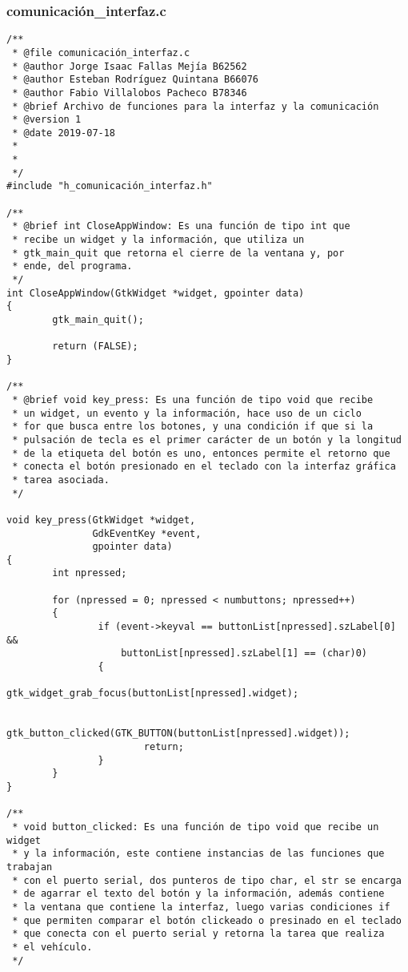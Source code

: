 \subsubsection{comunicación\_interfaz.c}
\begin{lstlisting}
/**
 * @file comunicación_interfaz.c
 * @author Jorge Isaac Fallas Mejía B62562
 * @author Esteban Rodríguez Quintana B66076
 * @author Fabio Villalobos Pacheco B78346
 * @brief Archivo de funciones para la interfaz y la comunicación
 * @version 1
 * @date 2019-07-18
 *
 *
 */
#include "h_comunicación_interfaz.h"

/**
 * @brief int CloseAppWindow: Es una función de tipo int que
 * recibe un widget y la información, que utiliza un
 * gtk_main_quit que retorna el cierre de la ventana y, por
 * ende, del programa.
 */
int CloseAppWindow(GtkWidget *widget, gpointer data)
{
        gtk_main_quit();

        return (FALSE);
}

/**
 * @brief void key_press: Es una función de tipo void que recibe
 * un widget, un evento y la información, hace uso de un ciclo
 * for que busca entre los botones, y una condición if que si la
 * pulsación de tecla es el primer carácter de un botón y la longitud
 * de la etiqueta del botón es uno, entonces permite el retorno que
 * conecta el botón presionado en el teclado con la interfaz gráfica
 * tarea asociada.
 */

void key_press(GtkWidget *widget,
               GdkEventKey *event,
               gpointer data)
{
        int npressed;

        for (npressed = 0; npressed < numbuttons; npressed++)
        {
                if (event->keyval == buttonList[npressed].szLabel[0] &&
                    buttonList[npressed].szLabel[1] == (char)0)
                {
                        gtk_widget_grab_focus(buttonList[npressed].widget);

                        gtk_button_clicked(GTK_BUTTON(buttonList[npressed].widget));
                        return;
                }
        }
}

/**
 * void button_clicked: Es una función de tipo void que recibe un widget
 * y la información, este contiene instancias de las funciones que trabajan
 * con el puerto serial, dos punteros de tipo char, el str se encarga
 * de agarrar el texto del botón y la información, además contiene
 * la ventana que contiene la interfaz, luego varias condiciones if
 * que permiten comparar el botón clickeado o presinado en el teclado
 * que conecta con el puerto serial y retorna la tarea que realiza
 * el vehículo.
 */


\end{lstlisting}
